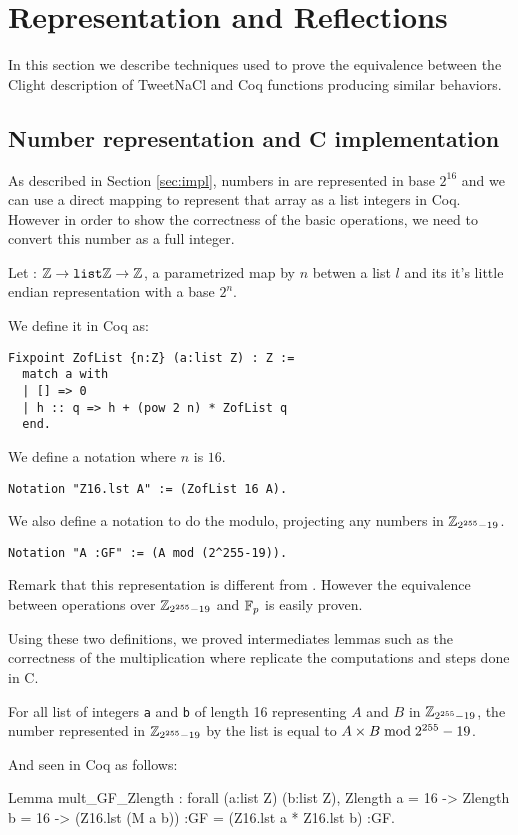 \section{Representation and Reflections}

In this section we describe techniques used to prove the equivalence between the
Clight description of TweetNaCl and Coq functions producing similar behaviors.

\subsection{Number representation and C implementation}

As described in Section \ref{sec:impl}, numbers in  are represented
in base $2^{16}$ and we can use a direct mapping to represent that array as a list
integers in Coq. However in order to show the correctness of the basic operations,
we need to convert this number as a full integer.
\begin{definition}
Let  : $\mathbb{Z} \rightarrow \texttt{list} \mathbb{Z} \rightarrow \mathbb{Z}$, a parametrized map by $n$ betwen a list $l$ and its
it's little endian representation with a base $2^n$.
\end{definition}
We define it in Coq as:
\begin{lstlisting}[language=Coq]
Fixpoint ZofList {n:Z} (a:list Z) : Z :=
  match a with
  | [] => 0
  | h :: q => h + (pow 2 n) * ZofList q
  end.
\end{lstlisting}
We define a notation where $n$ is $16$.
\begin{lstlisting}[language=Coq]
Notation "Z16.lst A" := (ZofList 16 A).
\end{lstlisting}
We also define a notation to do the modulo, projecting any numbers in $\mathbb{Z}_{2^{255}-19}$.
\begin{lstlisting}[language=Coq]
Notation "A :GF" := (A mod (2^255-19)).
\end{lstlisting}
Remark that this representation is different from .
However the equivalence between operations over $\mathbb{Z}_{2^{255}-19}$ and $\mathbb{F}_{p}$ is easily proven.

Using these two definitions, we proved intermediates lemmas such as the correctness of the
multiplication  where  replicate the computations and steps done in C.
\begin{lemma}
For all list of integers \texttt{a} and \texttt{b} of length 16 representing
$A$ and $B$ in $\mathbb{Z}_{2^{255}-19}$, the number represented in $\mathbb{Z}_{2^{255}-19}$ by the list 
is equal to $A \times B \bmod 2^{255}-19$.
\end{lemma}
And seen in Coq as follows:
\begin{Coq}
Lemma mult_GF_Zlength :
  forall (a:list Z) (b:list Z),
  Zlength a = 16 ->
  Zlength b = 16 ->
   (Z16.lst (M a b)) :GF =
   (Z16.lst a * Z16.lst b) :GF.
\end{Coq}

